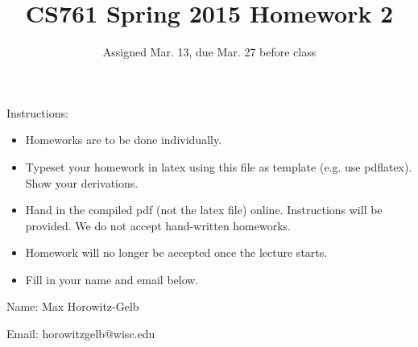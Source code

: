\documentclass{article}
\title{CS761 Spring 2015 Homework 2}
\author{Assigned Mar. 13, due Mar. 27 before class}
\date{}
\begin{document}
\maketitle

Instructions: 
\begin{itemize}
\item Homeworks are to be done individually.
\item Typeset your homework in latex using this file as template (e.g. use pdflatex).  Show your derivations.
\item Hand in the compiled pdf (not the latex file) online.  Instructions will be provided.  We do not accept hand-written homeworks.  
\item Homework will no longer be accepted once the lecture starts.
\item Fill in your name and email below.  
\end{itemize}


Name: Max Horowitz-Gelb                     

Email: horowitzgelb@wisc.edu

\newpage %
\end{document}
